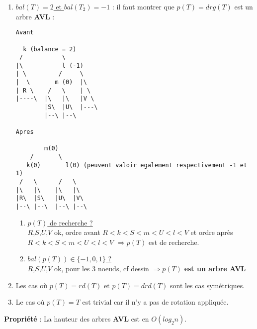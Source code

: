 \documentclass{article}
\begin{document}
\begin{enumerate}
\item \underline{$bal(T)=2$ et $bal(T_2)=-1$} : il faut montrer que $p(T) = drg(T)$ est un arbre \textbf{AVL} :

\begin{lstlisting}
Avant

  k (balance = 2)
 /           \
|\           l (-1)
| \         /     \
|  \       m (0)  |\
| R \    /   \    | \
|----\  |\   |\   |V \
        |S\  |U\  |---\
        |--\ |--\

Apres

        m(0)
    /       \
   k(0)       l(0) (peuvent valoir egalement respectivement -1 et 1)
 /   \      /   \
|\   |\    |\   |\
|R\  |S\   |U\  |V\
|--\ |--\  |--\ |--\     
\end{lstlisting}

\begin{enumerate}
\item \underline{$p(T)$ de recherche ?} \\
$R$,$S$,$U$,$V$ ok, ordre avant $R<k<S<m<U<l<V$ et ordre après $R<k<S<m<U<l<V$ $\Rightarrow p(T)$ est de 
recherche.
\item \underline{$bal(p(T)) \in \{-1,0,1\}$ ?}\\ 
$R$,$S$,$U$,$V$ ok, pour les 3 noeuds, cf dessin $\Rightarrow p(T)$ \textbf{est un arbre AVL}
\end{enumerate}
\item Les cas où $p(T) = rd(T)$ et $p(T) = drd(T)$ sont les cas symétriques.
\item Le cas où $p(T) = T$ est trivial car il n'y a pas de rotation appliquée. \\
\end{enumerate}

\noindent\textbf{Propriété} : La hauteur des arbres \textbf{AVL} est en $O(log_2n)$.
\end{document}
